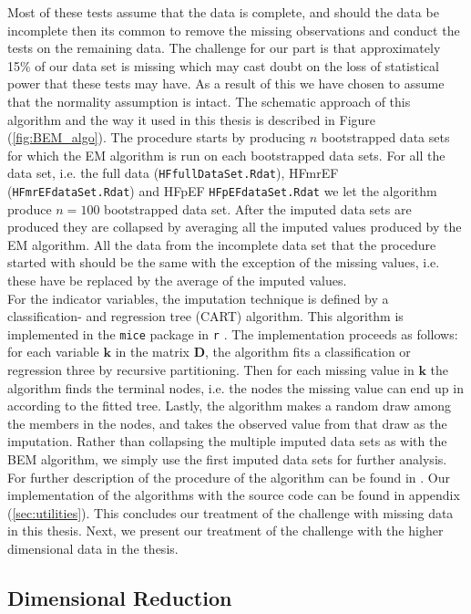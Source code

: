 \documentclass[../thesis.tex]{subfiles}
\begin{document}
Most of these tests assume that the data is complete, and should the data be incomplete then its common to remove the missing observations and conduct the tests on the remaining data. The challenge for our part is that approximately 15\% of our data set is missing which may cast doubt on the loss of statistical power that these tests may have. As a result of this we have chosen to assume that the normality assumption is intact. The schematic approach of this algorithm and the way it used in this thesis is described in Figure (\ref{fig:BEM_algo}). The procedure starts by producing $n$ bootstrapped data sets for which the EM algorithm is run on each bootstrapped data sets.  For all the data set, i.e. the full data (\texttt{HFfullDataSet.Rdat}), HFmrEF (\texttt{HFmrEFdataSet.Rdat}) and HFpEF \texttt{HFpEFdataSet.Rdat} we let the algorithm produce $n = 100$ bootstrapped data set. After the imputed data sets are produced they are collapsed by averaging all the imputed values produced by the EM algorithm. All the data from the incomplete data set that the procedure started with should be the same with the exception of the missing values, i.e. these have be replaced by the average of the imputed values.\\
\indent For the indicator variables, the imputation technique is defined by a classification- and regression tree (CART) algorithm. This algorithm is implemented in the \texttt{mice} package in \texttt{r} \citep{buuren2010mice}. The implementation proceeds as follows: for each variable $\boldsymbol{k}$ in the matrix $\boldsymbol{D}$, the algorithm fits a classification or regression three by recursive partitioning. Then for each missing value in $\boldsymbol{k}$ the algorithm finds the terminal nodes, i.e. the nodes the missing value can end up in according to the fitted tree. Lastly, the algorithm makes a random draw among the members in the nodes, and takes the observed value from that draw as the imputation. Rather than collapsing the multiple imputed data sets as with the BEM algorithm, we simply use the first imputed data sets for further analysis. For further description of the procedure of the algorithm can be found in \cite{burgette2010multiple}. Our implementation of the algorithms with the source code can be found in appendix (\ref{sec:utilities}). This concludes our treatment of the challenge with missing data in this thesis. Next, we present our treatment of the challenge with the higher dimensional data in the thesis.

\subsection{Dimensional Reduction}
\label{subsec:dim_red}
\end{document}

